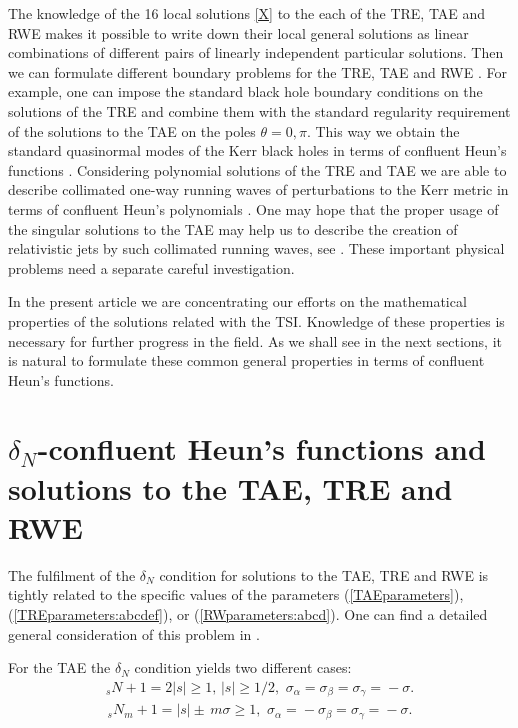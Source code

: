 \documentclass[prd,aps,twocolumn,leterpaper,preprintnumbers]{revtex4}
\numberwithin{equation}{section}
\newcommand{\ben}{\begin{eqnarray}}
\newcommand{\een}{\end{eqnarray}}
\newcommand{\la}{\label}
\begin{document}
The knowledge of the 16 local solutions \eqref{X} to the each of the TRE, TAE and RWE
makes it possible to write down their local general solutions as linear combinations
of different pairs of linearly independent particular solutions.
Then we can formulate different boundary problems for the TRE, TAE and RWE \cite{Fiziev1}.
For example, one can impose the standard black hole boundary conditions
on the solutions of the TRE and combine them with the standard regularity requirement
of the solutions to the TAE on the poles $\theta=0,\pi$.
This way we obtain the standard quasinormal modes  of the Kerr black holes
in terms of confluent Heun's functions \cite{Fiziev1}.
Considering polynomial solutions of the TRE and TAE
we are able to describe collimated one-way running waves
of perturbations to the Kerr metric in terms
of confluent Heun's polynomials \cite{Fiziev1}.
One may hope that the proper usage of the singular solutions to the TAE
may help us to describe the creation of relativistic jets by
such collimated running waves, see \cite{Fiziev1,PFDS}.
These important physical problems need a separate careful investigation.

In the present article we are concentrating our efforts on
the mathematical properties of the solutions related with the TSI.
Knowledge of these properties is necessary for further progress in the field.
%
As we shall see in the next sections,
it is natural to formulate these common general properties
in terms of confluent Heun's functions.


\section{$\delta_N$-confluent Heun's functions and solutions to the TAE, TRE and RWE}


The fulfilment of the $\delta_N$ condition for solutions to the TAE, TRE and RWE
is tightly related to the specific values of the parameters
(\ref{TAEparameters}), (\ref{TREparameters:abcdef}), or (\ref{RWparameters:abcd}).
One can find a detailed general consideration of this problem in \cite{Fiziev1}.

For the TAE the $\delta_N$ condition yields two different cases:
%
\ben
{}_sN\!+\!1\!=\!2|s|\geq 1,\,|s|\geq 1/2,\,\,\sigma_\alpha\!=\!\sigma_\beta\!=\!\sigma_\gamma\!=\!-\sigma.
\la{sN_Kerr}
\een
\ben
{}_sN_{m}\!+\!1=\!|s|\pm\,m \sigma\geq 1,\,\,\sigma_\alpha\!=\!-\sigma_\beta\!=\!\sigma_\gamma\!=\!-\sigma.
\la{sNm_Kerr_A}
\een
\end{document}
